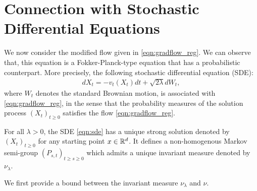 


\section{Connection with Stochastic Differential Equations}

We now consider the modified flow given in \eqref{eqn:gradflow_reg}. We can observe that, this equation is a Fokker-Planck-type equation that has a probabilistic counterpart. More precisely, the following stochastic differential equation (SDE):
\begin{align}
d X_t = - v_t(X_t) dt + \sqrt{2 \lambda } d W_t, \label{eqn:sde}
\end{align}
where $W_t$ denotes the standard Brownian motion, is associated with \eqref{eqn:gradflow_reg}, in the sense that the probability measures of the solution process $(X_t)_{t\geq0}$ satisfies the flow \eqref{eqn:gradflow_reg}.  

\begin{assumption}
\label{asmp:sde_ergo}
For all $\lambda >0$, the SDE  \eqref{eqn:sde} has a unique strong solution denoted by $(X_t)_{t\geq 0}$ for any starting point $x \in \mathbb{R}^d$. It defines a non-homogenous Markov semi-group $(P_{s,t})_{t\geq s\geq 0}$ which admits a unique invariant measure denoted by $\nu_\lambda$. 
\end{assumption}



We first provide a bound between the invariant measure $\nu_\lambda$ and $\nu$.

